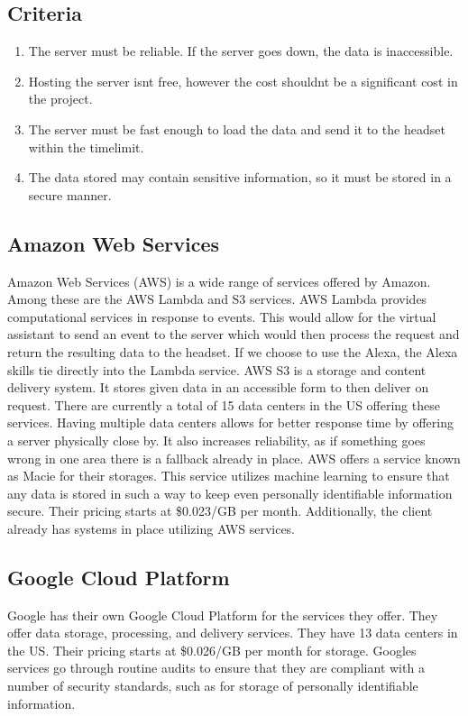 \documentclass[letterpaper,10pt,onecolumn]{IEEEtran}
\begin{document}
  \subsection {Criteria}
    \begin{enumerate}
      \item The server must be reliable. If the server goes down, the data is inaccessible.
      \item Hosting the server isn\textsc{}t free, however the cost shouldn\textsc{}t be a significant cost in the project.
      \item The server must be fast enough to load the data and send it to the headset within the timelimit.
      \item The data stored may contain sensitive information, so it must be stored in a secure manner.
    \end{enumerate}
  \subsection {Amazon Web Services}
    Amazon Web Services (AWS) is a wide range of services offered by Amazon. Among these are the AWS Lambda and S3 services. AWS Lambda provides computational services in response to events. This would allow for the virtual assistant to send an event to the server which would then process the request and return the resulting data to the headset. If we choose to use the Alexa, the Alexa skills tie directly into the Lambda service. AWS S3 is a storage and content delivery system. It stores given data in an accessible form to then deliver on request. There are currently a total of 15 data centers in the US offering these services. Having multiple data centers allows for better response time by offering a server physically close by. It also increases reliability, as if something goes wrong in one area there is a fallback already in place. AWS offers a service known as Macie for their storages. This service utilizes machine learning to ensure that any data is stored in such a way to  keep even personally identifiable information secure. Their pricing starts at \$0.023/GB per month. Additionally, the client already has systems in place utilizing AWS services. \cite{aws}

  \subsection {Google Cloud Platform}
    Google has their own Google Cloud Platform for the services they offer. They offer data storage, processing, and delivery services. They have 13 data centers in the US. Their pricing starts at \$0.026/GB per month for storage. Google\textsc{}s services go through routine audits to ensure that they are compliant with a number of security standards, such as for storage of personally identifiable information. \cite{gcp}
\end{document}
